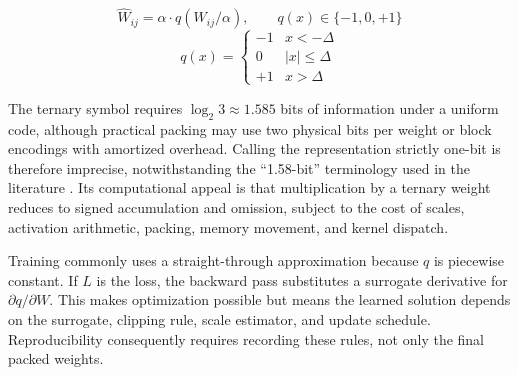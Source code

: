 \documentclass[11pt]{article}
\begin{document}
\[
\hat{W}_{ij} = \alpha \cdot q(W_{ij}/\alpha), \qquad q(x) \in \{-1,0,+1\}
\]
\[
q(x) = \begin{cases} -1 & x < -\Delta \\ 0 & |x| \leq \Delta \\ +1 & x > \Delta \end{cases}
\]

The ternary symbol requires $\log_2 3 \approx 1.585$ bits of information under a uniform code, although practical packing may use two physical bits per weight or block encodings with amortized overhead. Calling the representation strictly one-bit is therefore imprecise, notwithstanding the ``1.58-bit'' terminology used in the literature \cite{ma2024}. Its computational appeal is that multiplication by a ternary weight reduces to signed accumulation and omission, subject to the cost of scales, activation arithmetic, packing, memory movement, and kernel dispatch.

Training commonly uses a straight-through approximation because $q$ is piecewise constant. If $L$ is the loss, the backward pass substitutes a surrogate derivative for $\partial q/\partial W$. This makes optimization possible but means the learned solution depends on the surrogate, clipping rule, scale estimator, and update schedule. Reproducibility consequently requires recording these rules, not only the final packed weights.
\end{document}
